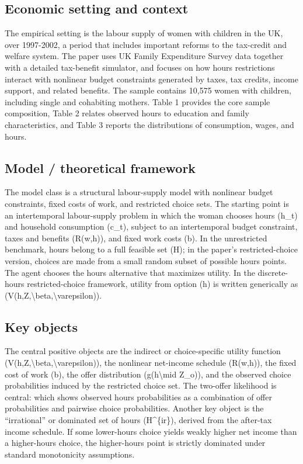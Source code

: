 \documentclass[11pt,a4paper]{article}
\begin{document}
\subsection*{Economic setting and context}
The empirical setting is the labour supply of women with children in the UK, over 1997-2002, a period that includes important reforms to the tax-credit and welfare system. The paper uses UK Family Expenditure Survey data together with a detailed tax-benefit simulator, and focuses on how hours restrictions interact with nonlinear budget constraints generated by taxes, tax credits, income support, and related benefits. The sample contains 10,575 women with children, including single and cohabiting mothers. Table 1 provides the core sample composition, Table 2 relates observed hours to education and family characteristics, and Table 3 reports the distributions of consumption, wages, and hours.

\subsection*{Model / theoretical framework}
The model class is a structural labour-supply model with nonlinear budget constraints, fixed costs of work, and restricted choice sets. The starting point is an intertemporal labour-supply problem in which the woman chooses hours (h\_t) and household consumption (c\_t), subject to an intertemporal budget constraint, taxes and benefits (R(w,h)), and fixed work costs (b). In the unrestricted benchmark, hours belong to a full feasible set (H); in the paper’s restricted-choice version, choices are made from a small random subset of possible hours points. The agent chooses the hours alternative that maximizes utility. In the discrete-hours restricted-choice framework, utility from option (h) is written generically as (V(h,Z,\textbackslash{}beta,\textbackslash{}varepsilon)).

\subsection*{Key objects}
The central positive objects are the indirect or choice-specific utility function (V(h,Z,\textbackslash{}beta,\textbackslash{}varepsilon)), the nonlinear net-income schedule (R(w,h)), the fixed cost of work (b), the offer distribution (g(h\textbackslash{}mid Z\_o)), and the observed choice probabilities induced by the restricted choice set. The two-offer likelihood is central: which shows observed hours probabilities as a combination of offer probabilities and pairwise choice probabilities. Another key object is the “irrational” or dominated set of hours (H\textasciicircum{}\{ir\}), derived from the after-tax income schedule. If some lower-hours choice yields weakly higher net income than a higher-hours choice, the higher-hours point is strictly dominated under standard monotonicity assumptions.
\end{document}
